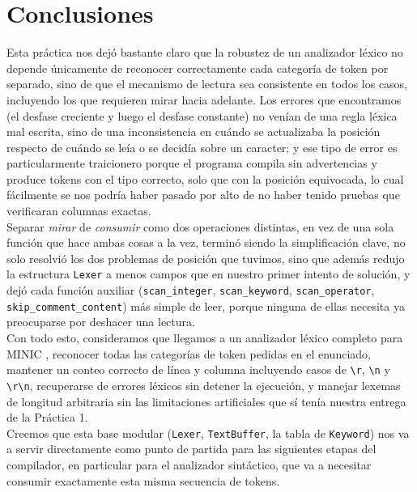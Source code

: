 \documentclass[12pt,letterpaper]{article}
\newcommand{\minic}{
  {M\footnotesize INI\normalsize C}
}
\begin{document}
\section*{Conclusiones}

Esta práctica nos dejó bastante claro que la robustez de un analizador léxico no depende únicamente de
reconocer correctamente cada categoría de token por separado, sino de que el mecanismo de lectura
sea consistente en todos los casos, incluyendo los que requieren mirar hacia adelante. Los errores que
encontramos (el desfase creciente y luego el desfase constante) no venían de una regla léxica mal escrita,
sino de una inconsistencia en cuándo se actualizaba la posición respecto de cuándo se leía o se decidía sobre
un caracter; y ese tipo de error es particularmente traicionero porque el programa compila sin advertencias y
produce tokens con el tipo correcto, solo que con la posición equivocada, lo cual fácilmente se nos podría
haber pasado por alto de no haber tenido pruebas que verificaran columnas exactas.\\

Separar \emph{mirar} de \emph{consumir} como dos operaciones distintas, en vez de una sola función que hace
ambas cosas a la vez, terminó siendo la simplificación clave, no solo resolvió los dos problemas de posición
que tuvimos, sino que además redujo la estructura \texttt{Lexer} a menos campos que en nuestro primer intento
de solución, y dejó cada función auxiliar (\texttt{scan\_integer}, \texttt{scan\_keyword},
\texttt{scan\_operator}, \texttt{skip\_comment\_content}) más simple de leer, porque ninguna de ellas necesita
ya preocuparse por deshacer una lectura.\\

Con todo esto, consideramos que llegamos a un analizador léxico completo para \minic, reconocer todas las
categorías de token pedidas en el enunciado, mantener un conteo correcto de línea y columna incluyendo casos
de \texttt{\textbackslash r}, \texttt{\textbackslash n} y \texttt{\textbackslash r\textbackslash n},
recuperarse de errores léxicos sin detener la ejecución, y manejar lexemas de longitud arbitraria sin las
limitaciones artificiales que sí tenía nuestra entrega de la Práctica 1.\\

Creemos que esta base modular (\texttt{Lexer}, \texttt{TextBuffer}, la tabla de \texttt{Keyword}) nos va a
servir directamente como punto de partida para las siguientes etapas del compilador, en particular para el
analizador sintáctico, que va a necesitar consumir exactamente esta misma secuencia de tokens.
\end{document}

